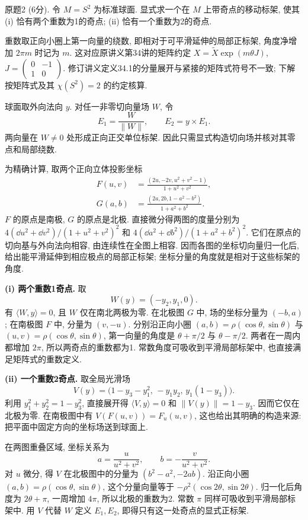 \par{}
\begin{exercise}\label{ps:9-2}
原题2 (6分). 令 $M=S^2$ 为标准球面. 显式求一个在 $M$ 上带奇点的移动标架, 使其 (i) 恰有两个重数为1的奇点; (ii) 恰有一个重数为2的奇点.
\end{exercise}
\begin{remark}
重数取正向小圈上第一向量的绕数, 即相对于可平滑延伸的局部正标架, 角度净增加 $2\pi m$ 时记为 $m$. 这对应原讲义第34讲的矩阵约定 $X=\widetilde X\exp(m\theta J)$, $J=\left(\begin{smallmatrix}0&-1\\1&0\end{smallmatrix}\right)$. 修订讲义定义34.1的分量展开与紧接的矩阵式符号不一致; 下解按矩阵式及其 $\chi(S^2)=2$ 的约定核算.
\end{remark}
\begin{solution}
球面取外向法向 $y$. 对任一非零切向量场 $W$, 令
\[
 E_1=\frac W{\|W\|},\qquad E_2=y\times E_1.
\]
两向量在 $W\ne0$ 处形成正向正交单位标架. 因此只需显式构造切向场并核对其零点和局部绕数.

为精确计算, 取两个正向立体投影坐标
\begin{align*}
 F(u,v)&=\frac{(2u,-2v,u^2+v^2-1)}{1+u^2+v^2},\\
 G(a,b)&=\frac{(2a,2b,1-a^2-b^2)}{1+a^2+b^2}.
\end{align*}
$F$ 的原点是南极, $G$ 的原点是北极. 直接微分得两图的度量分别为 $4(\dd u^2+\dd v^2)/(1+u^2+v^2)^2$ 和 $4(\dd a^2+\dd b^2)/(1+a^2+b^2)^2$. 它们在原点的切向基与外向法向相容, 由连续性在全图上相容. 因而各图的坐标切向量归一化后, 给出能平滑延伸到相应极点的局部正标架; 坐标分量的角度就是相对于这些标架的角度.

\textbf{(i) 两个重数1奇点.} 取
\[
 W(y)=(-y_2,y_1,0).
\]
有 $\langle W,y\rangle=0$, 且 $W$ 仅在南北两极为零. 在北极图 $G$ 中, 场的坐标分量为 $(-b,a)$; 在南极图 $F$ 中, 分量为 $(v,-u)$. 分别沿正向小圈 $(a,b)=\rho(\cos\theta,\sin\theta)$ 与 $(u,v)=\rho(\cos\theta,\sin\theta)$, 第一向量的角度是 $\theta+\pi/2$ 与 $\theta-\pi/2$. 两者在一周内都增加 $2\pi$, 所以两奇点的重数都为1. 常数角度可吸收到平滑局部标架中, 也直接满足矩阵式的重数定义.

\textbf{(ii) 一个重数2奇点.} 取全局光滑场
\[
 V(y)=\bigl(1-y_3-y_1^2,\,-y_1y_2,\,y_1(1-y_3)\bigr).
\]
利用 $y_1^2+y_2^2=1-y_3^2$, 直接展开得 $\langle V,y\rangle=0$ 和 $\|V(y)\|=1-y_3$. 因而它仅在北极为零. 在南极图中有 $V(F(u,v))=F_u(u,v)$, 这也给出其明确的构造来源: 把平面中固定方向的坐标场送到球面上.

在两图重叠区域, 坐标关系为
\[
 a=\frac{u}{u^2+v^2},\qquad b=-\frac{v}{u^2+v^2}.
\]
对 $u$ 微分, 得 $V$ 在北极图中的分量为 $(b^2-a^2,-2ab)$. 沿正向小圈 $(a,b)=\rho(\cos\theta,\sin\theta)$, 这个分量向量等于 $-\rho^2(\cos2\theta,\sin2\theta)$. 归一化后角度为 $2\theta+\pi$, 一周增加 $4\pi$, 所以北极的重数为2. 常数 $\pi$ 同样可吸收到平滑局部标架中. 用 $V$ 代替 $W$ 定义 $E_1,E_2$, 即得只有这一处奇点的显式正标架.
\end{solution}

